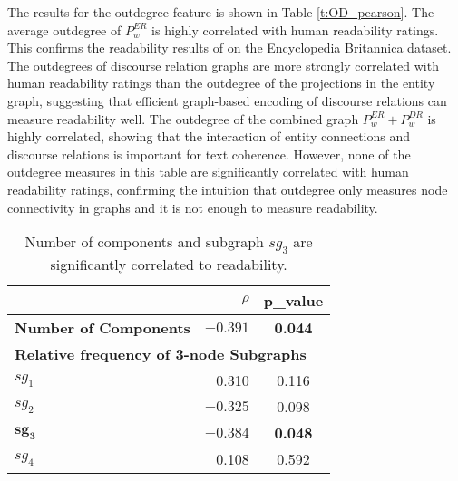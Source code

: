 The results for the outdegree feature is shown in Table \ref{t:OD_pearson}.
The average outdegree of $P_w^{ER}$ is highly correlated with human readability ratings. This confirms the readability results of
 on the Encyclopedia Britannica dataset. 
The outdegrees of discourse relation graphs are more strongly correlated with human readability ratings than the outdegree of the projections in the entity graph, suggesting that efficient graph-based encoding of discourse relations can measure readability well.
The outdegree of the combined graph $P_w^{ER}+P_w^{DR}$ is highly correlated, showing that the interaction of entity connections and discourse relations is important for text coherence.
However, none of the outdegree measures in this table are significantly correlated with human readability ratings, confirming the intuition that outdegree only measures node connectivity in graphs and it is not enough to measure readability.

\begin{table}[!h]
\centering
\begin{small}
\begin{tabular}{lrc}
\hline
   & $\rho$ & p\_value\\\hline
\textbf{Number of Components}   &       $\mathbf{-0.391}$       &       \textbf{0.044}  \\\hline

\multicolumn{3}{l}{\textbf{Relative frequency of 3-node Subgraphs}} \\
 $sg_1$ &  0.310 & 0.116\\
 $sg_2$ & $-0.325$ & 0.098\\
$\mathbf{sg_3}$ & $\mathbf{-0.384}$ & \textbf{0.048}\\
 $sg_4$ &  0.108 & 0.592\\\hline
\end{tabular}
\end{small}
\caption{Number of components and subgraph $sg_3$ are significantly correlated to readability.}
  \label{t:comp_3node_pearson}
\end{table}

